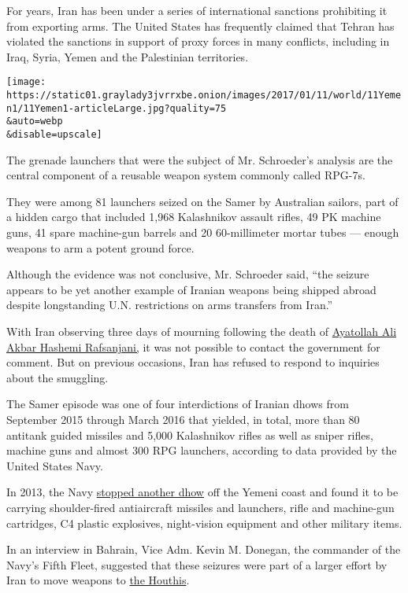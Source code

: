 For years, Iran has been under a series of international sanctions
prohibiting it from exporting arms. The United States has frequently
claimed that Tehran has violated the sanctions in support of proxy
forces in many conflicts, including in Iraq, Syria, Yemen and the
Palestinian territories.

\texttt{[image: https://static01.graylady3jvrrxbe.onion/images/2017/01/11/world/11Yemen1/11Yemen1-articleLarge.jpg?quality=75\\\&auto=webp\\\&disable=upscale]}

The grenade launchers that were the subject of Mr. Schroeder's analysis
are the central component of a reusable weapon system commonly called
RPG-7s.

They were among 81 launchers seized on the Samer by Australian sailors,
part of a hidden cargo that included 1,968 Kalashnikov assault rifles,
49 PK machine guns, 41 spare machine-gun barrels and 20 60-millimeter
mortar tubes --- enough weapons to arm a potent ground force.

Although the evidence was not conclusive, Mr. Schroeder said, ``the
seizure appears to be yet another example of Iranian weapons being
shipped abroad despite longstanding U.N. restrictions on arms transfers
from Iran.''

With Iran observing three days of mourning following the death of
\href{https://www.nytimes3xbfgragh.onion/2017/01/10/world/middleeast/iran-rafsanjani-funeral-protests.html?ref=world}{Ayatollah
Ali Akbar Hashemi Rafsanjani,} it was not possible to contact the
government for comment. But on previous occasions, Iran has refused to
respond to inquiries about the smuggling.

The Samer episode was one of four interdictions of Iranian dhows from
September 2015 through March 2016 that yielded, in total, more than 80
antitank guided missiles and 5,000 Kalashnikov rifles as well as sniper
rifles, machine guns and almost 300 RPG launchers, according to data
provided by the United States Navy.

In 2013, the Navy
\href{http://www.nytimes3xbfgragh.onion/2013/03/03/world/middleeast/seized-arms-off-yemen-raise-alarm-over-iran.html}{stopped
another dhow} off the Yemeni coast and found it to be carrying
shoulder-fired antiaircraft missiles and launchers, rifle and
machine-gun cartridges, C4 plastic explosives, night-vision equipment
and other military items.

In an interview in Bahrain, Vice Adm. Kevin M. Donegan, the commander of
the Navy's Fifth Fleet, suggested that these seizures were part of a
larger effort by Iran to move weapons to
\href{https://www.nytimes3xbfgragh.onion/2016/11/26/world/middleeast/houthi-rebels-yemen.html?rref=collection\%2Ftimestopic\%2FYemen\&action=click\&contentCollection=world\&region=stream\&module=stream_unit\&version=latest\&contentPlacement=10\&pgtype=collection}{the
Houthis}.

